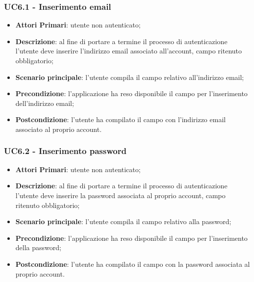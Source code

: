 \subsubsection{UC6.1 - Inserimento email}
\begin{itemize}
	\item \textbf{Attori Primari}: utente non autenticato;
	\item \textbf{Descrizione}: al fine di portare a termine il processo di autenticazione l'utente deve inserire l'indirizzo email associato all'account, campo ritenuto obbligatorio;
	\item \textbf{Scenario principale}: l'utente compila il campo relativo all'indirizzo email;	
	\item \textbf{Precondizione}: l'applicazione ha reso disponibile il campo per l'inserimento dell'indirizzo email;
	\item \textbf{Postcondizione}: l'utente ha compilato il campo con l'indirizzo email associato al proprio account.
\end{itemize}
\subsubsection{UC6.2 - Inserimento password}
\begin{itemize}
	\item \textbf{Attori Primari}: utente non autenticato;
	\item \textbf{Descrizione}: al fine di portare a termine il processo di autenticazione l'utente deve inserire la password associata al proprio account, campo ritenuto obbligatorio;
	\item \textbf{Scenario principale}: l'utente compila il campo relativo alla password;	
	\item \textbf{Precondizione}: l'applicazione ha reso disponibile il campo per l'inserimento della password;
	\item \textbf{Postcondizione}: l'utente ha compilato il campo con la password associata al proprio account.
\end{itemize}
